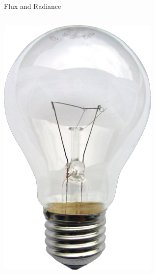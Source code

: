 \documentclass[10pt,compress,professionalfont]{beamer}
\begin{document}
\begin{frame}{Flux and Radiance}
\begin{columns}
\begin{column}{0.4\textwidth}
{                \includegraphics[width=\textwidth]{../img/external/lightbulb}\\
            }
        \end{column}
    \end{columns}



\end{frame}
\end{document}
